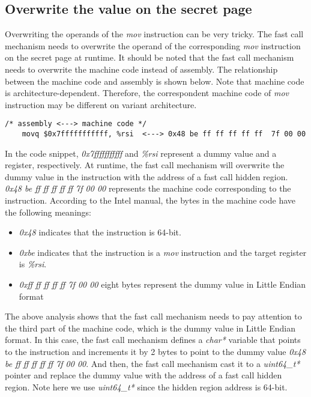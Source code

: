   \subsection{Overwrite the value on the secret page}

  Overwriting the operands of the \emph{mov} instruction can be very tricky. 
  The fast call mechanism needs to overwrite the operand of the corresponding 
  \emph{mov} instruction on the secret page at runtime. It should be noted that 
  the fast call mechanism needs to overwrite the machine code instead of 
  assembly. The relationship between the machine code and assembly is 
  shown below. Note that machine code is architecture-dependent. Therefore, the correspondent 
  machine code of \emph{mov} instruction may be different on variant architecture.
   

  \begin{lstlisting}[style=CStyle]
    /* assembly <---> machine code */
    movq $0x7fffffffffff, %rsi  <---> 0x48 be ff ff ff ff ff  7f 00 00
  \end{lstlisting}

  In the code snippet, \emph{0x7fffffffffff} and \emph{\%rsi} represent a dummy 
  value and a register, respectively. At runtime, the fast call mechanism 
  will overwrite the dummy value in the instruction with the address of a 
  fast call hidden region. \emph{0x48 be ff ff ff ff ff  7f 00 00} represents the 
  machine code corresponding to the instruction. According to the Intel manual, 
  the bytes in the machine code have the following meanings:
  
  \begin{itemize}
    \item \emph{0x48} indicates that the instruction is 64-bit.
    \item \emph{0xbe} indicates that the instruction is a \emph{mov} instruction and the target register is \emph{\%rsi}.
    \item \emph{0xff ff ff ff ff 7f 00 00 } eight bytes represent the dummy value in Little Endian format
  \end{itemize}
  
  The above analysis shows that the fast call mechanism needs to pay attention to 
  the third part of the machine code, which is the dummy value in Little Endian 
  format. In this case, the fast call mechanism defines a \emph{char*} variable that 
  points to the instruction and increments it by 2 bytes to point to the 
  dummy value \emph{0x48 be ff ff ff ff ff  7f 00 00}. And then, the fast call mechanism cast it to a \emph{uint64\_t*}
  pointer and replace the dummy value with the address of a fast call hidden 
  region. Note here we use \emph{uint64\_t*} since the hidden region address is 64-bit.

